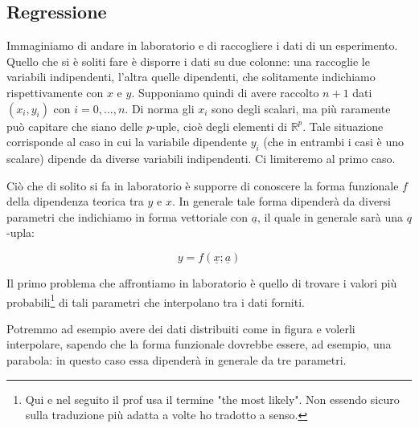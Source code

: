 \subsection{Regressione}
Immaginiamo di andare in laboratorio e di raccogliere i dati di un esperimento. Quello che si è soliti fare è disporre i dati su due colonne: una raccoglie le variabili indipendenti, l'altra quelle dipendenti, che solitamente indichiamo rispettivamente con $x$ e $y$. Supponiamo quindi di avere raccolto $n+1$ dati $(x_i,y_i)$ con $i=0,\ldots,n$. Di norma gli $x_i$ sono degli scalari, ma più raramente può capitare che siano delle $p$-uple, cioè degli elementi di $\mathbb{R}^p$. Tale situazione corrisponde al caso in cui la variabile dipendente $y_i$ (che in entrambi i casi è uno scalare) dipende da diverse variabili indipendenti. Ci limiteremo al primo caso.

Ciò che di solito si fa in laboratorio è supporre di conoscere la forma funzionale $f$ della dipendenza teorica tra $y$ e $x$. In generale tale forma dipenderà da diversi parametri che indichiamo in forma vettoriale con $\underline{a}$, il quale in generale sarà una $q$-upla:

$$y=f( \underline{x};\underline{a} )$$

Il primo problema che affrontiamo in laboratorio è quello di trovare i valori più probabili\footnote{Qui e nel seguito il prof usa il termine "the most likely". Non essendo sicuro sulla traduzione più adatta a volte ho tradotto a senso.} di tali parametri che interpolano tra i dati forniti.

\vspace{0.3cm}

\begin{minipage}{0.445\textwidth}
   \centering
\end{minipage}
\begin{minipage}{0.55\textwidth}
   \vspace{0.2cm}Potremmo ad esempio avere dei dati distribuiti come in figura e volerli interpolare, sapendo che la forma funzionale dovrebbe essere, ad esempio, una parabola: in questo caso essa dipenderà in generale da tre parametri.
\end{minipage}

